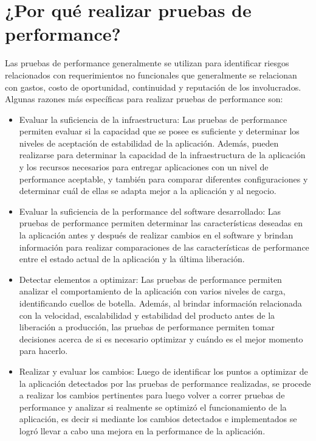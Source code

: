 \section{¿Por qué realizar pruebas de performance?}
\label{capitulo2:por_que_pruebas}
Las pruebas de performance generalmente se utilizan para identificar riesgos relacionados con requerimientos no funcionales que generalmente se relacionan con gastos, costo de
oportunidad, continuidad y reputación de los involucrados. \\ Algunas razones más específicas para realizar pruebas de performance son:
\begin{itemize}
  \item
  Evaluar la suficiencia de la infraestructura:
  	Las pruebas de performance permiten evaluar si la capacidad que se posee es suficiente y determinar los niveles de aceptación de estabilidad de la aplicación. Además, pueden realizarse para determinar la capacidad de la infraestructura de la aplicación y los recursos necesarios para entregar aplicaciones con un nivel de performance aceptable, y también para comparar diferentes configuraciones y determinar cuál de ellas se adapta mejor a la aplicación y al negocio.
  \item 
  Evaluar la suficiencia de la performance del software desarrollado:
  	Las pruebas de performance permiten determinar las características deseadas en la aplicación antes y después de realizar cambios en el software y brindan información para realizar comparaciones de las características de performance entre el estado actual de la aplicación y la última liberación.
  \item 
  Detectar elementos a optimizar:
    Las pruebas de performance permiten analizar el comportamiento de la aplicación con varios niveles de carga, identificando cuellos de botella. Además, al brindar información relacionada con la velocidad, escalabilidad y estabilidad del producto antes de la liberación a producción, las pruebas de performance permiten tomar decisiones acerca de si es necesario optimizar y cuándo es el mejor momento para hacerlo.
	\item
	Realizar y evaluar los cambios:
		Luego de identificar los puntos a optimizar de la aplicación detectados por las pruebas de performance realizadas, se procede a realizar los cambios pertinentes para luego volver a correr pruebas de performance y analizar si realmente se optimizó el funcionamiento de la aplicación, es decir si mediante los cambios detectados e implementados se logró llevar a cabo una mejora en la performance de la aplicación.

\end{itemize}
